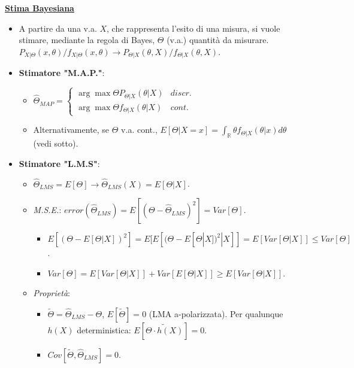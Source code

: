 \documentclass[8pt]{extarticle}
\begin{document}
\begin{multicols*}{3}
    \textbf{\underline{Stima Bayesiana}}
    \begin{itemize}
        \item A partire da una v.a. $X$, che rappresenta l'esito di una misura, si vuole stimare, mediante la regola di Bayes, $\Theta$ (v.a.) quantità da misurare. $P_{X|\Theta}(x, \theta)/f_{X|\Theta}(x, \theta)\rightarrow P_{\Theta|X}(\theta, X)/f_{\Theta|X}(\theta, X)$.
        \item \textbf{Stimatore "M.A.P."}:
              \begin{itemize}
                  \item $\hat{\Theta}_{MAP}=\begin{cases}
                                \arg\max{\Theta}P_{\Theta|X}(\theta|X) & discr. \\
                                \arg\max{\Theta}f_{\Theta|X}(\theta|X) & cont.
                            \end{cases}$
                  \item Alternativamente, se $\Theta$ v.a. cont., $E[\Theta|X=x]=\int_{\mathbb{R}}\theta f_{\Theta|X}(\theta|x)d\theta$ (vedi sotto).
              \end{itemize}
        \item \textbf{Stimatore "L.M.S"}:
              \begin{itemize}
                  \item $\hat{\Theta}_{LMS}=E[\Theta]\rightarrow\hat{\Theta}_{LMS}(X)=E[\Theta|X]$.
                  \item \textit{M.S.E.}: $error(\hat{\Theta}_{LMS})=E[(\Theta-\hat{\Theta}_{LMS})^{2}]=Var[\Theta]$.
                        \begin{itemize}
                            \item $E[(\Theta-E[\Theta|X])^{2}]=E[E[(\Theta-E[\Theta|X])^{2}|X]]=E[Var[\Theta|X]]\leq Var[\Theta]$.
                            \item $Var[\Theta]=E[Var[\Theta|X]]+Var[E[\Theta|X]]\ge E[Var[\Theta|X]]$.
                        \end{itemize}
                  \item \textit{Proprietà}:
                        \begin{itemize}
                            \item $\widetilde{\Theta}=\hat{\Theta}_{LMS}-\Theta$, $E[\widetilde{\Theta}]=0$ (LMA a-polarizzata). Per qualunque $h(X)$ deterministica: $E[\widetilde{\Theta\cdot h(X)}]=0$.
                            \item $Cov[\widetilde{\Theta}, \hat{\Theta}_{LMS}]=0$.

\end{itemize}
\end{itemize}
\end{itemize}
\end{multicols*}
\end{document}

